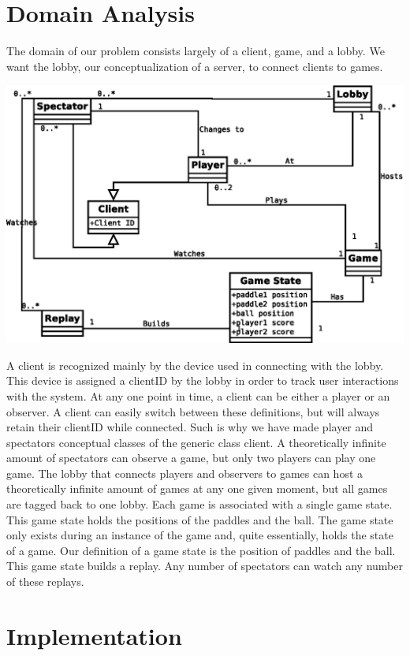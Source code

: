 \documentclass[letterpaper,12pt]{article}
\begin{document}
\section{Domain Analysis}
The domain of our problem consists largely of a client, game, and a lobby. We want the lobby, our conceptualization of a server, to connect clients to games.\\
\begin{center}\includegraphics{DomAnaUML.eps} \end{center} 
A client is recognized mainly by the device used in connecting with the lobby. This device is assigned a clientID by the lobby in order to track user interactions with the system. At any one point in time, a client can be either a player or an observer. A client can easily switch between these definitions, but will always retain their clientID while connected. Such is why we have made player and spectators conceptual classes of the generic class client. A theoretically infinite amount of spectators can observe a game, but only two players can play one game. The lobby that connects players and observers to games can host a theoretically infinite amount of games at any one given moment, but all games are tagged back to one lobby. Each game is associated with a single game state. This game state holds the positions of the paddles and the ball. The game state only exists during an instance of the game and, quite essentially, holds the state of a game. Our definition of a game state is the position of paddles and the ball. This game state builds a replay. Any number of spectators can watch any number of these replays. 

\section{Implementation}
\end{document}
